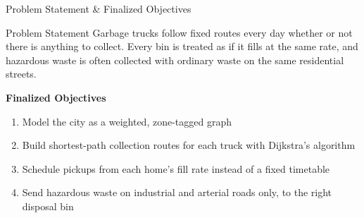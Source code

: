 \documentclass[aspectratio=169,11pt]{beamer}
\begin{document}
\begin{frame}{Problem Statement \& Finalized Objectives}
\small

\begin{block}{Problem Statement}
Garbage trucks follow fixed routes every day whether or not there is anything to collect.
Every bin is treated as if it fills at the same rate, and hazardous waste is often collected
with ordinary waste on the same residential streets.
\end{block}

\vspace{2mm}

\textbf{\color{GEUBlue}Finalized Objectives}

\begin{enumerate}\itemsep3pt
\item Model the city as a weighted, zone-tagged graph
\item Build shortest-path collection routes for each truck with Dijkstra's algorithm
\item Schedule pickups from each home's fill rate instead of a fixed timetable
\item Send hazardous waste on industrial and arterial roads only, to the right disposal bin
\end{enumerate}

\end{frame}
\end{document}
